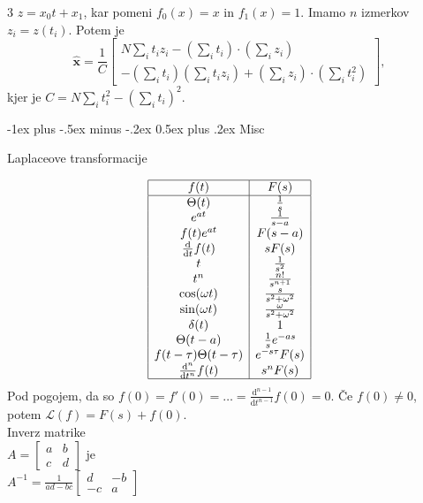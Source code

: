 \documentclass[10pt,landscape]{article}
\makeatletter
\renewcommand{\section}{\@startsection{section}{1}{0mm}%
	{-1ex plus -.5ex minus -.2ex}%
	{0.5ex plus .2ex}%
	{\normalfont\large\bfseries}}
\theoremstyle{definition}
\makeatother
\begin{document}
\begin{multicols}{3}
  \( z = x_0 t + x_1 \), kar pomeni \( f_0 (x) = x \) in \( f_1 (x) = 1 \). Imamo \( n \) izmerkov \( z_i = z (t_i) \). Potem je
  \[ \hat{\mathbf{x}} = \frac{1}{C} \begin{bmatrix} N \sum\limits_i^{} t_i z_i  - \left( \sum\limits_i^{} t_i \right) \cdot \left( \sum\limits_{i}^{}z_i \right) \\ - \left( \sum\limits_i^{} t_i \right) \left( \sum\limits_i^{} t_i z_i \right) + \left( \sum\limits_i^{} z_i \right) \cdot \left( \sum\limits_i^{} t_i ^2 \right)  \end{bmatrix},
  \]
  kjer je \( C = N \sum\limits_i^{} t_i ^2 - \left( \sum\limits_i^{} t_i \right) ^2 \).

  \section{Misc}

  Laplaceove transformacije

  \[
    \begin{array}[tb]{|c|c|} \hline
      f(t) & F(s)  \\\hline
      \Theta(t) & \frac{1}{s}  \\
      e^{at} & \frac{1}{s - a} \\
      f(t) e^{at}& F(s - a) \\
      \frac{\mathrm{d} }{\mathrm{d} t} f(t) & s F(s) \\
      t & \frac{1}{s ^2} \\
      t^n & \frac{n!}{s^{n + 1}} \\
      \cos (\omega t) & \frac{s}{s ^2 + \omega ^2} \\
      \sin (\omega t) & \frac{\omega}{s ^2 + \omega ^2} \\
      \delta(t) & 1 \\
      \Theta(t - a) & \frac{1}{s} e^{-a s} \\
      f(t - \tau) \Theta(t - \tau) & e^{- s \tau} F(s) \\
      \frac{\mathrm{d} ^{n}}{\mathrm{d} t^n} f(t) & s^n F(s) \\ \hline
    \end{array}
  \]
  Pod pogojem, da so \( f(0) = f'(0) = \ldots = \frac{\mathrm{d} ^{n - 1}}{\mathrm{d} t^{n - 1}} f(0) = 0 \). Če \( f(0) \ne 0 \), potem \( \mathcal{L}(f) = F(s) + f(0) \).\\
  Inverz matrike \\
  \( A = \begin{bmatrix}
         a & b \\
         c & d
  \end{bmatrix} \) je\\
  \( A^{-1} = \frac{1}{ad - bc} \begin{bmatrix}
               d & -b \\
               -c & a
               \end{bmatrix} \)
\end{multicols}
\end{document}
